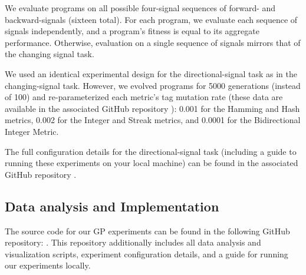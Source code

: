 We evaluate programs on all possible four-signal sequences of forward- and backward-signals (sixteen total).
For each program, we evaluate each sequence of signals independently, and a program's fitness is equal to its aggregate performance.
Otherwise, evaluation on a single sequence of signals mirrors that of the changing signal task.

We used an identical experimental design for the directional-signal task as in the changing-signal task. 
However, we evolved programs for 5000 generations (instead of 100) and re-parameterized each metric's tag mutation rate (these data are available in the associated GitHub repository ): 
0.001 for the Hamming and Hash metrics, 0.002 for the Integer and Streak metrics, and 0.0001 for the Bidirectional Integer Metric. 

The full configuration details for the directional-signal task (including a guide to running these experiments on your local machine) can be found in the associated GitHub repository .

\subsection{Data analysis and Implementation}

The source code for our GP experiments can be found in the following GitHub repository: . This repository additionally includes all data analysis and visualization scripts, experiment configuration details, and a guide for running our experiments locally.


